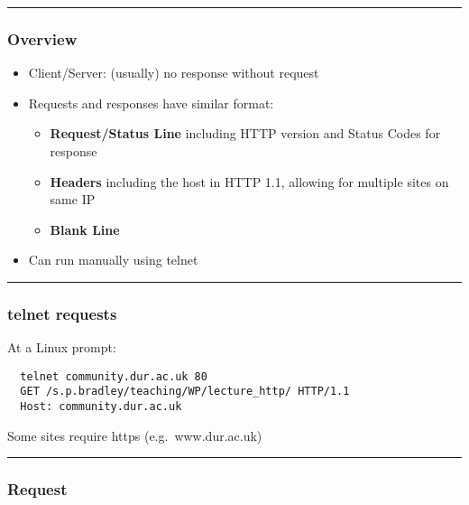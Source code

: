 \documentclass{article}[18pt]
\providecommand{\tightlist}{%
  \setlength{\itemsep}{0pt}\setlength{\parskip}{0pt}}
\begin{document}
\begin{center}\rule{0.5\linewidth}{\linethickness}\end{center}

\hypertarget{overview}{%
\subsubsection{Overview}\label{overview}}

\begin{itemize}
\tightlist
\item
  Client/Server: (usually) no response without request
\item
  Requests and responses have similar format:

  \begin{itemize}
  \tightlist
  \item
    \textbf{Request/Status Line} including HTTP version and Status Codes
    for response
  \item
    \textbf{Headers} including the host in HTTP 1.1, allowing for
    multiple sites on same IP
  \item
    \textbf{Blank Line}
  \end{itemize}
\item
  Can run manually using telnet
\end{itemize}

\begin{center}\rule{0.5\linewidth}{\linethickness}\end{center}

\hypertarget{telnet-requests}{%
\subsubsection{telnet requests}\label{telnet-requests}}

At a Linux prompt:

\begin{verbatim}
  telnet community.dur.ac.uk 80
  GET /s.p.bradley/teaching/WP/lecture_http/ HTTP/1.1
  Host: community.dur.ac.uk
\end{verbatim}

Some sites require https (e.g.~www.dur.ac.uk)

\begin{center}\rule{0.5\linewidth}{\linethickness}\end{center}

\hypertarget{request}{%
\subsubsection{Request}\label{request}}
\end{document}
